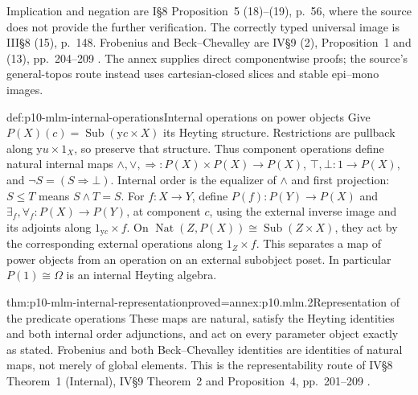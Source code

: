 Implication and negation are I\S8 Proposition~5 (18)--(19), p.~56, where
the source does not provide the further verification. The correctly typed universal
image is III\S8 (15), p.~148. Frobenius and Beck--Chevalley are IV\S9 (2),
Proposition~1 and (13), pp.~204--209 \cite{MacLaneMoerdijk1992}.
The annex supplies direct componentwise proofs; the source's general-topos
route instead uses cartesian-closed slices and stable epi--mono images.

\begin{hbdefinition}{def:p10-mlm-internal-operations}{Internal operations on power objects}
Give \(P(X)(c)=\operatorname{Sub}(\mathrm yc\times X)\) its Heyting structure.
Restrictions are pullback along \(\mathrm yu\times1_X\), so preserve that
structure. Thus component operations define natural internal maps
\(\wedge,\vee,\Rightarrow:P(X)\times P(X)\to P(X)\), \(\top,\bot:1\to P(X)\),
and \(\neg S=(S\Rightarrow\bot)\). Internal order is the equalizer of
\(\wedge\) and first projection: \(S\leq T\) means \(S\wedge T=S\).
For \(f:X\to Y\), define \(P(f):P(Y)\to P(X)\) and
\(\exists_f,\forall_f:P(X)\to P(Y)\), at component \(c\), using the external
inverse image and its adjoints along \(1_{\mathrm yc}\times f\).
On \(\operatorname{Nat}(Z,P(X))\cong\operatorname{Sub}(Z\times X)\), they act
by the corresponding external operations along \(1_Z\times f\).
This separates a map of power objects from an operation on an external
subobject poset. In particular \(P(1)\cong\Omega\) is an internal Heyting algebra.
\end{hbdefinition}

\begin{hbtheorem}{thm:p10-mlm-internal-representation}{proved=annex:p10.mlm.2}{Representation of the predicate operations}
These maps are natural, satisfy the Heyting identities and both internal
order adjunctions, and act on every parameter object exactly as stated.
Frobenius and both Beck--Chevalley identities are identities of natural maps,
not merely of global elements. This is the representability route of IV\S8
Theorem~1 (Internal), IV\S9 Theorem~2 and Proposition~4, pp.~201--209
\cite{MacLaneMoerdijk1992}.
\end{hbtheorem}

